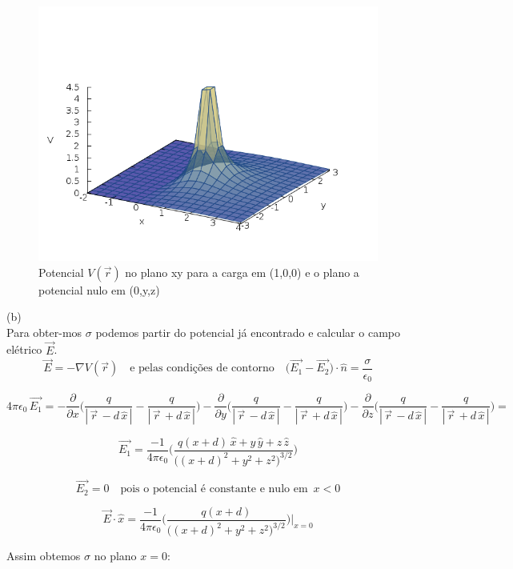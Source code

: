 \documentclass[a4paper,11pt]{exam}
\begin{document}
{	\begin{figure}[h]
		\centering
		\includegraphics[scale=0.7]{V.png}
		\caption{ Potencial $V(\vec{r})$ no plano xy para a carga em (1,0,0) e o plano a potencial nulo em (0,y,z)}
	\end{figure}
	
	(b)
	\\
	\indent Para obter-mos $\sigma$ podemos partir do potencial já encontrado e calcular o campo elétrico $\vec{E}$.
	\[\vec{E} = - \nabla V(\vec{r}) \quad \text{e pelas condições de contorno} \quad \big( \vec{E_1} - \vec{E_2} \Big)\cdot\hat{n} = \frac{\sigma}{\epsilon_0} \]

	\[ 4 \pi \epsilon_0 \, \vec{E_1} = -\frac{\partial }{\partial x} \Bigg( \frac{q}{|\,\vec{r}\, - d\,\hat{x}\,|} - \frac{q}{|\,\vec{r}\, + d\,\hat{x}\,|} \Bigg) - \frac{\partial }{\partial y} \Bigg( \frac{q}{|\,\vec{r}\, - d\,\hat{x}\,|} - \frac{q}{|\,\vec{r}\, + d\,\hat{x}\,|} \Bigg) - \frac{\partial }{\partial z} \Bigg( \frac{q}{|\,\vec{r}\, - d\,\hat{x}\,|} - \frac{q}{|\,\vec{r}\, + d\,\hat{x}\,|} \Bigg) = \]
	
        \[\vec{E_1} = \frac{-1}{4 \pi \epsilon_0} \Bigg( \frac{ q (x+d) \, \hat{x} + y \, \hat{y} + z \, \hat{z}}{\Big((x+d)^2 + y^2 + z^2 \Big)^{3/2}} \Bigg)\]
	
	\[\vec{E_2} = 0 \quad \text{pois o potencial é constante e nulo em } \, x<0\]
	
	\[\vec{E} \cdot \hat{x}  = \frac{-1}{4 \pi \epsilon_0} \Bigg( \frac{q(x+d)}{\Big((x+d)^2 + y^2 + z^2 \Big)^{3/2}} \Bigg) \Bigg|_{x=0}\]
	
	Assim obtemos $\sigma$ no plano $x=0$:
	
}
\end{document}
